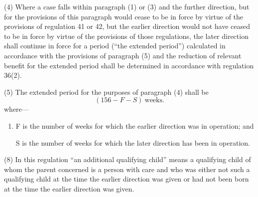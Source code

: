 \documentclass[a4paper,12pt]{article}
\begin{document}
(4) Where a case falls within paragraph (1) or (3) and the further direction, but for the provisions of this paragraph would cease to be in force by virtue of the provisions of regulation 41 or 42, but the earlier direction would not have ceased to be in force by virtue of the provisions of those regulations, the later direction shall continue in force for a period (“the extended period”) calculated in accordance with the provisions of paragraph (5) and the reduction of relevant benefit 
for the extended period shall be determined in accordance with regulation 36(2).  %

(5) The extended period for the purposes of paragraph (4) shall be 
\[(156-F-S) \mathrm{\ weeks.}\]  %
 where—
\begin{enumerate}\item[]
F is the number of weeks for which the earlier direction was in operation; and

S is the number of weeks for which the later direction has been in operation.
\end{enumerate}

%

(8) In this regulation “an additional qualifying child” means a qualifying child of whom the parent concerned is a person with care and who was either not such a qualifying child at the time the earlier direction was given or had not been born at the time the earlier direction was given.
\end{document}
